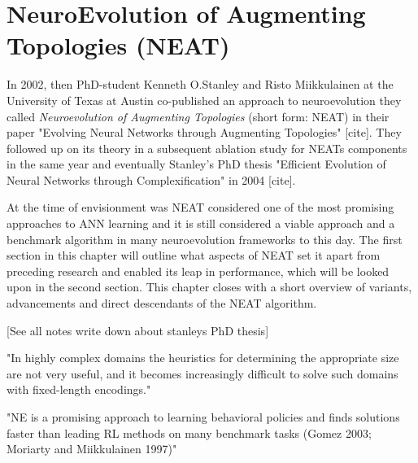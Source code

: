 \documentclass[journal, a4paper]{IEEEtran}
\begin{document}




\section{NeuroEvolution of Augmenting Topologies (NEAT)} \label{sec:neat}


In 2002, then PhD-student Kenneth O.Stanley and Risto Miikkulainen at the University of Texas at Austin co-published an approach to neuroevolution they called \textit{Neuroevolution of Augmenting Topologies} (short form: NEAT) in their paper "Evolving Neural Networks through Augmenting Topologies" [cite]. They followed up on its theory in a subsequent ablation study for NEATs components in the same year and eventually Stanley's PhD thesis "Efficient Evolution of Neural Networks through Complexification" in 2004 [cite].

At the time of envisionment was NEAT considered one of the most promising approaches to ANN learning and it is still considered a viable approach and a benchmark algorithm in many neuroevolution frameworks to this day. The first section in this chapter will outline what aspects of NEAT set it apart from preceding research and enabled its leap in performance, which will be looked upon in the second section. This chapter closes with a short overview of variants, advancements and direct descendants of the NEAT algorithm.





[See all notes write down about stanleys PhD thesis]

"In highly complex domains the heuristics for determining the appropriate size are not very useful, and it becomes increasingly difficult to solve such domains with fixed-length encodings." \cite{sta04}

"NE is a promising approach to learning behavioral policies and finds solutions faster than leading RL methods on many benchmark tasks (Gomez 2003; Moriarty and Miikkulainen 1997)" \cite{sta04}
\end{document}
